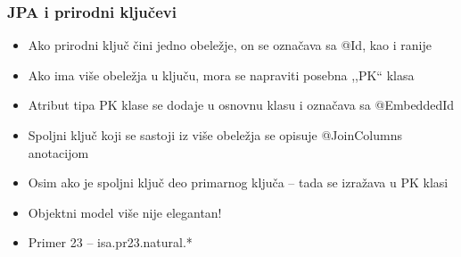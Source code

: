 \documentclass[compress]{beamer}
\begin{document}
\begin{frame}
  \frametitle{JPA i prirodni ključevi}
  \begin{itemize}
    \item Ako prirodni ključ čini jedno obeležje, on se označava sa @Id, kao i ranije
    \item Ako ima više obeležja u ključu, mora se napraviti posebna ,,PK`` klasa
    \item Atribut tipa PK klase se dodaje u osnovnu klasu i označava sa @EmbeddedId
  \end{itemize}

  \begin{itemize}
    \item Spoljni ključ koji se sastoji iz više obeležja se opisuje @JoinColumns anotacijom
    \item Osim ako je spoljni ključ deo primarnog ključa -- tada se izražava u PK klasi
    \item Objektni model više nije elegantan!
  \end{itemize}

  \begin{itemize}
    \item Primer 23 -- isa.pr23.natural.*
  \end{itemize}
\end{frame}
\end{document}
